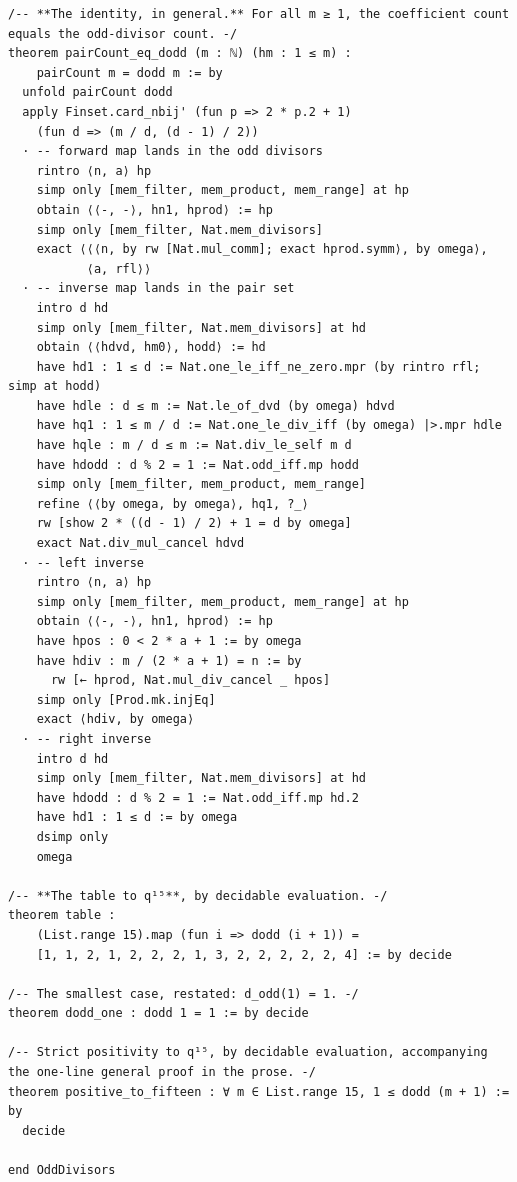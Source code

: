 \documentclass[11pt,a4paper]{article}
\theoremstyle{plain}
\theoremstyle{definition}
\theoremstyle{remark}
\begin{document}
\begin{Verbatim}[fontsize=\footnotesize,breaklines=true,breakanywhere=true,formatcom=\leanmono]
/-- **The identity, in general.** For all m ≥ 1, the coefficient count
equals the odd-divisor count. -/
theorem pairCount_eq_dodd (m : ℕ) (hm : 1 ≤ m) :
    pairCount m = dodd m := by
  unfold pairCount dodd
  apply Finset.card_nbij' (fun p => 2 * p.2 + 1)
    (fun d => (m / d, (d - 1) / 2))
  · -- forward map lands in the odd divisors
    rintro ⟨n, a⟩ hp
    simp only [mem_filter, mem_product, mem_range] at hp
    obtain ⟨⟨-, -⟩, hn1, hprod⟩ := hp
    simp only [mem_filter, Nat.mem_divisors]
    exact ⟨⟨⟨n, by rw [Nat.mul_comm]; exact hprod.symm⟩, by omega⟩,
           ⟨a, rfl⟩⟩
  · -- inverse map lands in the pair set
    intro d hd
    simp only [mem_filter, Nat.mem_divisors] at hd
    obtain ⟨⟨hdvd, hm0⟩, hodd⟩ := hd
    have hd1 : 1 ≤ d := Nat.one_le_iff_ne_zero.mpr (by rintro rfl; simp at hodd)
    have hdle : d ≤ m := Nat.le_of_dvd (by omega) hdvd
    have hq1 : 1 ≤ m / d := Nat.one_le_div_iff (by omega) |>.mpr hdle
    have hqle : m / d ≤ m := Nat.div_le_self m d
    have hdodd : d % 2 = 1 := Nat.odd_iff.mp hodd
    simp only [mem_filter, mem_product, mem_range]
    refine ⟨⟨by omega, by omega⟩, hq1, ?_⟩
    rw [show 2 * ((d - 1) / 2) + 1 = d by omega]
    exact Nat.div_mul_cancel hdvd
  · -- left inverse
    rintro ⟨n, a⟩ hp
    simp only [mem_filter, mem_product, mem_range] at hp
    obtain ⟨⟨-, -⟩, hn1, hprod⟩ := hp
    have hpos : 0 < 2 * a + 1 := by omega
    have hdiv : m / (2 * a + 1) = n := by
      rw [← hprod, Nat.mul_div_cancel _ hpos]
    simp only [Prod.mk.injEq]
    exact ⟨hdiv, by omega⟩
  · -- right inverse
    intro d hd
    simp only [mem_filter, Nat.mem_divisors] at hd
    have hdodd : d % 2 = 1 := Nat.odd_iff.mp hd.2
    have hd1 : 1 ≤ d := by omega
    dsimp only
    omega

/-- **The table to q¹⁵**, by decidable evaluation. -/
theorem table :
    (List.range 15).map (fun i => dodd (i + 1)) =
    [1, 1, 2, 1, 2, 2, 2, 1, 3, 2, 2, 2, 2, 2, 4] := by decide

/-- The smallest case, restated: d_odd(1) = 1. -/
theorem dodd_one : dodd 1 = 1 := by decide

/-- Strict positivity to q¹⁵, by decidable evaluation, accompanying
the one-line general proof in the prose. -/
theorem positive_to_fifteen : ∀ m ∈ List.range 15, 1 ≤ dodd (m + 1) := by
  decide

end OddDivisors
\end{Verbatim}
\end{document}
